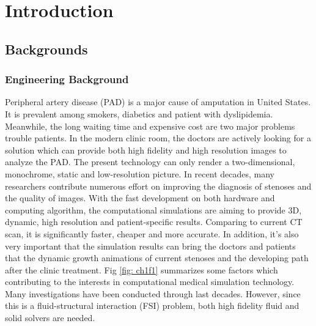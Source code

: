 \chapter{Introduction}
\label{ch:chap1}


\section{Backgrounds}

\subsection{Engineering Background}

Peripheral artery disease (PAD) is a major cause of amputation in United States. It is prevalent among smokers, diabetics and patient with dyslipidemia. Meanwhile, the long waiting time and expensive cost are two major problems trouble patients. In the modern clinic room, the doctors are actively looking for a solution which can provide both high fidelity and high resolution images to analyze the PAD. The  present technology can only render a two-dimensional,  monochrome, static and low-resolution picture. In recent decades, many researchers contribute numerous effort on improving the diagnosis of stenoses and the quality of images\cite{clark1976fluid, nesbitt2009shear, wardlaw2006non, stergiopulos1992computer, long2001numerical}. With the fast development on both hardware and computing algorithm, the computational simulations are aiming to provide 3D, dynamic, high resolution and patient-specific results. Comparing to current CT scan, it is significantly faster, cheaper and more accurate. In addition, it's also very important that the simulation results can bring the doctors and patients that the dynamic growth animations of current stenoses and the developing path after the clinic treatment. Fig \ref{fig: ch1f1} summarizes some factors which contributing to the interests in computational medical simulation technology\cite{barry2005features}. Many investigations have been conducted through last decades\cite{feng2012viscous, bertram2010evaluation, nadeem2010simulation, ogulu2005simulation}. However, since this is a fluid-structural interaction (FSI) problem, both high fidelity fluid and solid solvers are needed. 

